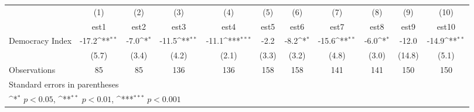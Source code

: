 {
\def\sym#1{\ifmmode^{#1}\else\(^{#1}\)\fi}
\begin{tabular}{l*{10}{c}}
\hline\hline
                    &\multicolumn{1}{c}{(1)}         &\multicolumn{1}{c}{(2)}         &\multicolumn{1}{c}{(3)}         &\multicolumn{1}{c}{(4)}         &\multicolumn{1}{c}{(5)}         &\multicolumn{1}{c}{(6)}         &\multicolumn{1}{c}{(7)}         &\multicolumn{1}{c}{(8)}         &\multicolumn{1}{c}{(9)}         &\multicolumn{1}{c}{(10)}         \\
                    &        est1         &        est2         &        est3         &        est4         &        est5         &        est6         &        est7         &        est8         &        est9         &       est10         \\
\hline
Democracy Index     &       -17.2\sym{**} &        -7.0\sym{*}  &       -11.5\sym{**} &       -11.1\sym{***}&        -2.2         &        -8.2\sym{*}  &       -15.6\sym{**} &        -6.0\sym{*}  &       -12.0         &       -14.9\sym{**} \\
                    &       (5.7)         &       (3.4)         &       (4.2)         &       (2.1)         &       (3.3)         &       (3.2)         &       (4.8)         &       (3.0)         &      (14.8)         &       (5.1)         \\
\hline
Observations        &          85         &          85         &         136         &         136         &         158         &         158         &         141         &         141         &         150         &         150         \\
\hline\hline
\multicolumn{11}{l}{\footnotesize Standard errors in parentheses}\\
\multicolumn{11}{l}{\footnotesize \sym{*} \(p<0.05\), \sym{**} \(p<0.01\), \sym{***} \(p<0.001\)}\\
\end{tabular}
}
